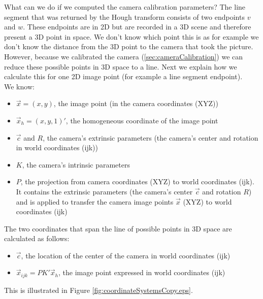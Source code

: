 	What can we do if we computed the camera calibration parameters?
	The line segment that was returned by the Hough transform consists of two
	endpoints $v$ and $w$. These endpoints are in 2D but are recorded in a 3D
	scene and therefore present a 3D point in space. We don't know which point
	this is as for example we don't know the distance from the 3D point to the camera that took
	the picture. 
	However, because we calibrated the camera (\ref{sec:cameraCalibration}) we
	can reduce these possible points in 3D space to a line. Next we explain how
	we calculate this for one 2D image point (for example a line segment endpoint).\\

	We know:
	\begin{itemize}
		\item $\vec{x} = (x,y)$, the image point (in the camera coordinates
		(XYZ))
		\item $\vec{x}_{h} = (x,y,1)'$, the homogeneous coordinate of the image point
		\item $\vec{c}$ and $R$, the camera's extrinsic parameters (the
		camera's center and rotation in world coordinates (ijk))
		\item $K$, the camera's intrinsic parameters
		\item $P$, the projection from camera coordinates (XYZ) to world
		coordinates (ijk). It contains the 
		extrinsic parameters (the camera's center $\vec{c}$ and rotation 
		$R$) and is applied to transfer the camera image points $\vec{x}$ (XYZ) to world
		coordinates (ijk)
	\end{itemize}

	The two coordinates that span the line of possible points in 3D space are
	calculated as follows:
	\begin{itemize}
		\item $\vec{c}$, the location of the center of the camera in 
		world coordinates (ijk)
		\item $\vec{x}_{ijk} = P K' \vec{x}_{h}$, the image point expressed in world coordinates (ijk)\\
	\end{itemize}
	This is illustrated in Figure \ref{fig:coordinateSystemsCopy.eps}.

	\clearpage

